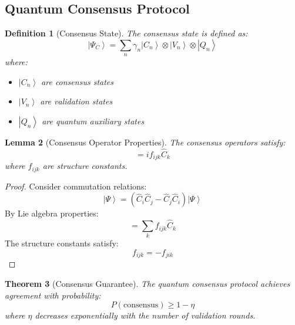 \documentclass[12pt]{article}
\newcommand{\ket}[1]{\left|#1\right\rangle}
\newcommand{\op}[1]{\hat{#1}}
\newtheorem{theorem}{Theorem}[section]
\newtheorem{lemma}[theorem]{Lemma}
\newtheorem{definition}[theorem]{Definition}
\begin{document}
\subsection{Quantum Consensus Protocol}
\begin{definition}[Consensus State]
The consensus state is defined as:
\begin{equation}
\ket{\Psi_C} = \sum_n \gamma_n\ket{C_n} \otimes \ket{V_n} \otimes \ket{Q_n}
\end{equation}
where:
\begin{itemize}
\item $\ket{C_n}$ are consensus states
\item $\ket{V_n}$ are validation states
\item $\ket{Q_n}$ are quantum auxiliary states
\end{itemize}
\end{definition}
\begin{lemma}[Consensus Operator Properties]
The consensus operators satisfy:
\begin{equation}
[\op{C}_i,\op{C}_j] = if_{ijk}\op{C}_k
\end{equation}
where $f_{ijk}$ are structure constants.
\end{lemma}
\begin{proof}
Consider commutation relations:
\begin{equation}
[\op{C}_i,\op{C}_j]\ket{\Psi} = (\op{C}_i\op{C}_j - \op{C}_j\op{C}_i)\ket{\Psi}
\end{equation}
By Lie algebra properties:
\begin{equation}
[\op{C}_i,\op{C}_j] = \sum_k f_{ijk}\op{C}_k
\end{equation}
The structure constants satisfy:
\begin{equation}
f_{ijk} = -f_{jik}
\end{equation}
\end{proof}
\begin{theorem}[Consensus Guarantee]
The quantum consensus protocol achieves agreement with probability:
\begin{equation}
P(\text{consensus}) \geq 1 - \eta
\end{equation}
where $\eta$ decreases exponentially with the number of validation rounds.
\end{theorem}
\end{document}
